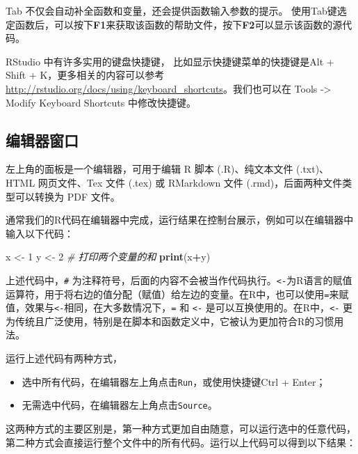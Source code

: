 \documentclass[
]{book}
\newenvironment{Shaded}{\begin{snugshade}}{\end{snugshade}}
\newcommand{\CommentTok}[1]{\textcolor[rgb]{0.56,0.35,0.01}{\textit{#1}}}
\newcommand{\DecValTok}[1]{\textcolor[rgb]{0.00,0.00,0.81}{#1}}
\newcommand{\FunctionTok}[1]{\textcolor[rgb]{0.13,0.29,0.53}{\textbf{#1}}}
\newcommand{\NormalTok}[1]{#1}
\newcommand{\OtherTok}[1]{\textcolor[rgb]{0.56,0.35,0.01}{#1}}
\newcommand{\SpecialCharTok}[1]{\textcolor[rgb]{0.81,0.36,0.00}{\textbf{#1}}}
\begin{document}
Tab 不仅会自动补全函数和变量，还会提供函数输入参数的提示。
使用Tab键选定函数后，可以按下\textbf{F1}来获取该函数的帮助文件，按下\textbf{F2}可以显示该函数的源代码。

RStudio 中有许多实用的键盘快捷键，
比如显示快捷键菜单的快捷键是Alt + Shift + K，更多相关的内容可以参考\url{http://rstudio.org/docs/using/keyboard_shortcuts}。我们也可以在 Tools -\textgreater{} Modify Keyboard Shortcuts 中修改快捷键。

\subsection{编辑器窗口}\label{ux7f16ux8f91ux5668ux7a97ux53e3}

左上角的面板是一个编辑器，可用于编辑 R 脚本 (.R)、纯文本文件 (.txt)、HTML 网页文件、Tex 文件 (.tex) 或 RMarkdown 文件 (.rmd)，后面两种文件类型可以转换为 PDF 文件。

通常我们的R代码在编辑器中完成，运行结果在控制台展示，例如可以在编辑器中输入以下代码：

\begin{Shaded}
\begin{Highlighting}[]
\NormalTok{x }\OtherTok{\textless{}{-}} \DecValTok{1}
\NormalTok{y }\OtherTok{\textless{}{-}} \DecValTok{2}
\CommentTok{\# 打印两个变量的和}
\FunctionTok{print}\NormalTok{(x}\SpecialCharTok{+}\NormalTok{y)}
\end{Highlighting}
\end{Shaded}

上述代码中，\texttt{\#} 为注释符号，后面的内容不会被当作代码执行。\texttt{\textless{}-}为R语言的赋值运算符，用于将右边的值分配（赋值）给左边的变量。在R中，也可以使用\texttt{=}来赋值，效果与\texttt{\textless{}-}相同，在大多数情况下，\texttt{=} 和 \texttt{\textless{}-} 是可以互换使用的。在R中，\texttt{\textless{}-} 更为传统且广泛使用，特别是在脚本和函数定义中，它被认为更加符合R的习惯用法。

运行上述代码有两种方式，

\begin{itemize}
\item
  选中所有代码，在编辑器左上角点击\texttt{Run}，或使用快捷键Ctrl + Enter；
\item
  无需选中代码，在编辑器左上角点击\texttt{Source}。
\end{itemize}

这两种方式的主要区别是，第一种方式更加自由随意，可以运行选中的任意代码，第二种方式会直接运行整个文件中的所有代码。运行以上代码可以得到以下结果：
\end{document}
